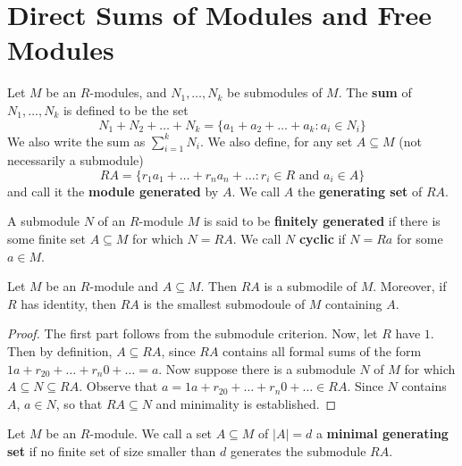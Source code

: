 \section{Direct Sums of Modules and Free Modules}

\begin{definition}
  Let $M$ be an  $R$-modules, and  $N_1, \dots, N_k$ be submodules of
  $M$. The  \textbf{sum} of $N_1, \dots, N_k$ is defined to be the set
  \begin{equation*}
    N_1+N_2+\dots+N_k=
    \{ a_1+a_2+\dots+a_k : a_i \in N_i \}
  \end{equation*}
  We also write the sum as $\sum_{i=1}^k{N_i}$.
  We also define, for any set $A \subseteq M$ (not necessarily a
  submodule)
  \begin{equation*}
    RA=
    \{ r_1a_1+\dots+r_na_n+\dots : r_i \in R \text{ and } a_i \in A \}
  \end{equation*}
  and call it the \textbf{module generated} by $A$. We call  $A$ the
  \textbf{generating set} of $RA$.
\end{definition}

\begin{definition}
  A submodule $N$ of an  $R$-module  $M$ is said to be
  \textbf{finitely generated} if there is some finite set $A \subseteq
  M$ for which $N=RA$. We call $N$ \textbf{cyclic} if $N=Ra$ for some
  $a \in M$.
\end{definition}

\begin{lemma}\label{lemma_4.4.1}
  Let $M$ be an  $R$-module and  $A \subseteq M$. Then $RA$ is a
  submodile of  $M$. Moreover, if  $R$ has identity, then  $RA$ is the
  smallest submodoule of  $M$ containing  $A$.
\end{lemma}
\begin{proof}
  The first part follows from the submodule criterion. Now, let $R$
  have  $1$. Then by definition, $A \subseteq RA$, since $RA$
  contains all formal sums of the form  $1a+r_20+\dots+r_n0+\dots=a$.
  Now suppose there is a submodule $N$ of  $M$ for which  $A \subseteq
  N \subseteq RA$. Observe that $a=1a+r_20+\dots+r_n0+\dots \in RA$.
  Since $N$ contains $A$, $a \in N$, so that $RA \subseteq N$ and
  minimality is established.
\end{proof}

\begin{definition}
  Let $M$ be an $R$-module. We call a set $A \subseteq M$ of $|A|=d$ a
  \textbf{minimal generating set} if no finite set of size smaller
  than $d$ generates the submodule $RA$.
\end{definition}

